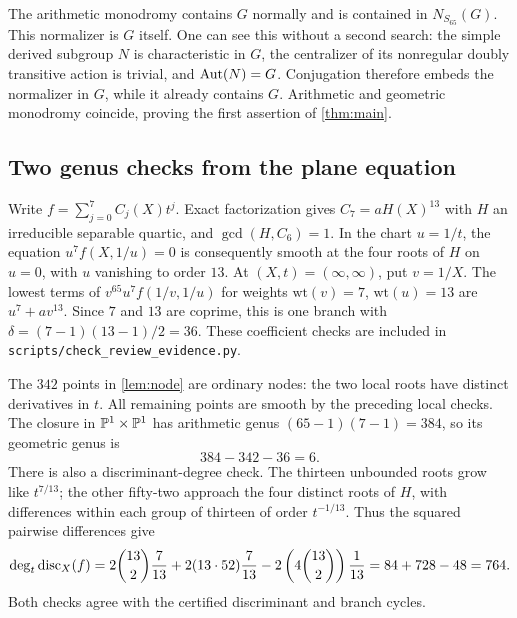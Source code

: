 The arithmetic monodromy contains $G$ normally and is contained in
$N_{S_{65}}(G)$. This normalizer is $G$ itself. One can see this
without a second search: the simple derived subgroup $N$ is characteristic
in $G$, the centralizer of its nonregular doubly transitive action is
trivial, and $\operatorname{Aut}(N)=G$. Conjugation therefore embeds the normalizer in
$G$, while it already contains $G$. Arithmetic and geometric monodromy
coincide, proving the first assertion of \cref{thm:main}.

\subsection{Two genus checks from the plane equation}
Write $f=\sum_{j=0}^7 C_j(X)t^j$. Exact factorization gives
$C_7=aH(X)^{13}$ with $H$ an irreducible separable quartic, and
$\gcd(H,C_6)=1$. In the chart $u=1/t$, the equation
$u^7f(X,1/u)=0$ is consequently smooth at the four roots of $H$ on $u=0$,
with $u$ vanishing to order $13$. At $(X,t)=(\infty,\infty)$, put
$v=1/X$. The lowest terms of $v^{65}u^7f(1/v,1/u)$ for weights
$\mathrm{wt}(v)=7$, $\mathrm{wt}(u)=13$ are $u^7+av^{13}$.
Since $7$ and $13$ are coprime, this is one branch with
$\delta=(7-1)(13-1)/2=36$. These coefficient checks are included in
\texttt{scripts/check\_review\_evidence.py}.

The $342$ points in \cref{lem:node} are ordinary nodes: the two local roots
have distinct derivatives in $t$. All remaining points are smooth by the
preceding local checks. The closure in $\mathbb{P}^1\times\mathbb{P}^1$ has arithmetic
genus $(65-1)(7-1)=384$, so its geometric genus is
\[
 384-342-36=6.
\]
There is also a discriminant-degree check. The thirteen unbounded roots
grow like $t^{7/13}$; the other fifty-two approach the four distinct roots
of $H$, with differences within each group of thirteen of order
$t^{-1/13}$. Thus the squared pairwise differences give
\[
 \deg_t\operatorname{disc}_X(f)
 =2\binom{13}{2}\frac7{13}
  +2(13\cdot52)\frac7{13}
  -2\left(4\binom{13}{2}\right)\frac1{13}
 =84+728-48=764.
\]
Both checks agree with the certified discriminant and branch cycles.

